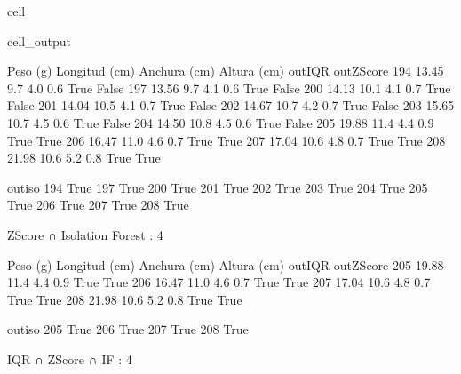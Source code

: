 \documentclass[a4paper,10pt,spanish]{jupyterBook}
\begin{document}
\begin{sphinxuseclass}{cell}
\begin{sphinxVerbatimOutput}
\begin{sphinxuseclass}{cell_output}
\begin{sphinxVerbatim}[commandchars=\\\{\}]
     Peso (g)  Longitud (cm)  Anchura (cm)  Altura (cm)  out\PYGZus{}IQR  out\PYGZus{}ZScore  \PYGZbs{}
194     13.45            9.7           4.0          0.6     True       False
197     13.56            9.7           4.1          0.6     True       False
200     14.13           10.1           4.1          0.7     True       False
201     14.04           10.5           4.1          0.7     True       False
202     14.67           10.7           4.2          0.7     True       False
203     15.65           10.7           4.5          0.6     True       False
204     14.50           10.8           4.5          0.6     True       False
205     19.88           11.4           4.4          0.9     True        True
206     16.47           11.0           4.6          0.7     True        True
207     17.04           10.6           4.8          0.7     True        True
208     21.98           10.6           5.2          0.8     True        True

     out\PYGZus{}iso
194     True
197     True
200     True
201     True
202     True
203     True
204     True
205     True
206     True
207     True
208     True
\end{sphinxVerbatim}

\begin{sphinxVerbatim}[commandchars=\\\{\}]
Z\PYGZhy{}Score ∩ Isolation Forest : 4
\end{sphinxVerbatim}

\begin{sphinxVerbatim}[commandchars=\\\{\}]
     Peso (g)  Longitud (cm)  Anchura (cm)  Altura (cm)  out\PYGZus{}IQR  out\PYGZus{}ZScore  \PYGZbs{}
205     19.88           11.4           4.4          0.9     True        True
206     16.47           11.0           4.6          0.7     True        True
207     17.04           10.6           4.8          0.7     True        True
208     21.98           10.6           5.2          0.8     True        True

     out\PYGZus{}iso
205     True
206     True
207     True
208     True
\end{sphinxVerbatim}

\begin{sphinxVerbatim}[commandchars=\\\{\}]
IQR ∩ Z\PYGZhy{}Score ∩ IF         : 4
\end{sphinxVerbatim}


\end{sphinxuseclass}
\end{sphinxVerbatimOutput}
\end{sphinxuseclass}
\end{document}
